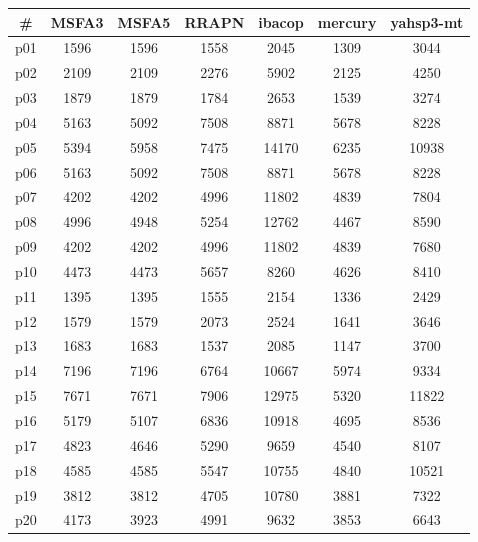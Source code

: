 \begin{tabular}{ccccccc}
\toprule
\textbf{\#} & \textbf{MSFA3} & \textbf{MSFA5} & \textbf{RRAPN} & \textbf{ibacop} & \textbf{mercury} & \textbf{yahsp3-mt}\\
\midrule
p01 & 1596 & 1596 & 1558 & 2045 & 1309 & 3044\\
p02 & 2109 & 2109 & 2276 & 5902 & 2125 & 4250\\
p03 & 1879 & 1879 & 1784 & 2653 & 1539 & 3274\\
p04 & 5163 & 5092 & 7508 & 8871 & 5678 & 8228\\
p05 & 5394 & 5958 & 7475 & 14170 & 6235 & 10938\\
p06 & 5163 & 5092 & 7508 & 8871 & 5678 & 8228\\
p07 & 4202 & 4202 & 4996 & 11802 & 4839 & 7804\\
p08 & 4996 & 4948 & 5254 & 12762 & 4467 & 8590\\
p09 & 4202 & 4202 & 4996 & 11802 & 4839 & 7680\\
p10 & 4473 & 4473 & 5657 & 8260 & 4626 & 8410\\
p11 & 1395 & 1395 & 1555 & 2154 & 1336 & 2429\\
p12 & 1579 & 1579 & 2073 & 2524 & 1641 & 3646\\
p13 & 1683 & 1683 & 1537 & 2085 & 1147 & 3700\\
p14 & 7196 & 7196 & 6764 & 10667 & 5974 & 9334\\
p15 & 7671 & 7671 & 7906 & 12975 & 5320 & 11822\\
p16 & 5179 & 5107 & 6836 & 10918 & 4695 & 8536\\
p17 & 4823 & 4646 & 5290 & 9659 & 4540 & 8107\\
p18 & 4585 & 4585 & 5547 & 10755 & 4840 & 10521\\
p19 & 3812 & 3812 & 4705 & 10780 & 3881 & 7322\\
p20 & 4173 & 3923 & 4991 & 9632 & 3853 & 6643\\
\bottomrule
\end{tabular}

